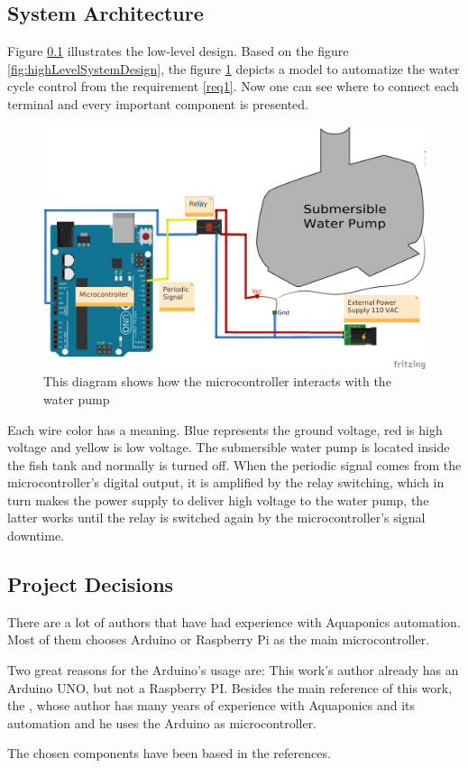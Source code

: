 \subsection{System Architecture}
\label{sec:architecture}

Figure \ref{sec:architecture} illustrates the low-level design.
Based on the figure \ref{fig:highLevelSystemDesign},
the figure \ref{fig:waterCycleDiagram} depicts a model to automatize the water cycle control from the requirement \ref{req1}.
Now one can see where to connect each terminal and every important component is presented.

\begin{figure}[h]
    \centering
    \includegraphics[width=.6\linewidth]{diagrams/architecture_bb}
    \caption{This diagram shows how the microcontroller interacts with the water pump}
    \label{fig:waterCycleDiagram}
\end{figure}

Each wire color has a meaning.
Blue represents the ground voltage,
red is high voltage
and yellow is low voltage.
The submersible water pump is located inside the fish tank and normally is turned off.
When the periodic signal comes from the microcontroller's digital output,
it is amplified by the relay switching,
which in turn makes the power supply to deliver high voltage to the water pump,
the latter works until the relay is switched again by the microcontroller's signal downtime.

\subsection{Project Decisions}
There are a lot of authors \cite{GoddekDelaideMankasinghEtAl2015} \cite{clark2009system} \cite{Leatherbury2014} that have had experience with Aquaponics automation.
Most of them chooses Arduino or Raspberry Pi as the main microcontroller.

Two great reasons for the Arduino's usage are:
This work's author already has an Arduino UNO,
but not a Raspberry PI.
Besides the main reference of this work,
the \cite{Kretzinger2015},
whose author has many years of experience with Aquaponics and its automation and he uses the Arduino as microcontroller.

The chosen components have been based in the references.
